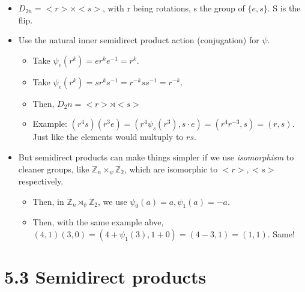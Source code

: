 \documentclass[11pt, oneside]{article}   	%
\begin{document}
\begin{itemize}
\item $D_{2n} = <r> \times <s>$, with r being rotations, s the group of $\{e, s\}$.  S is the flip.
\item Use the natural  inner semidirect product action (conjugation) for $\psi$.
\begin{itemize}
\item Take $\psi_e(r^k) = er^ke^{-1} = r^k.$ 
\item Take $\psi_e(r^k) = sr^ks^{-1} = r^{-k}ss^{-1} = r^{-k}$.
\item Then, $D_2n = <r> \rtimes <s>$ 
\item Example: $(r^4s)(r^3e) = (r^4\psi_s(r^3), s \cdot e) = (r^4r^{-3}, s) = (r,s)$.  Just like the elements would multuply to $rs$.
\end{itemize}
\item But semidirect products can make things simpler if we use \emph{isomorphism} to cleaner groups, like $\mathbb{Z}_n \times_{\psi} \mathbb{Z}_2$, which are isomorphic to $<r>, <s>$ respectively.
\begin{itemize}
  \item Then, in  $\mathbb{Z}_n \rtimes_{\psi} \mathbb{Z}_2$, we use $\psi_0(a) = a, \psi_1(a) = -a$.
  \item Then, with the same example abve, $(4,1)(3,0) = (4 + \psi_1(3), 1 + 0) = (4 - 3, 1) = (1,1)$.  Same!
  \end{itemize}
\end{itemize}

 \section{5.3 Semidirect products}
\end{document}
